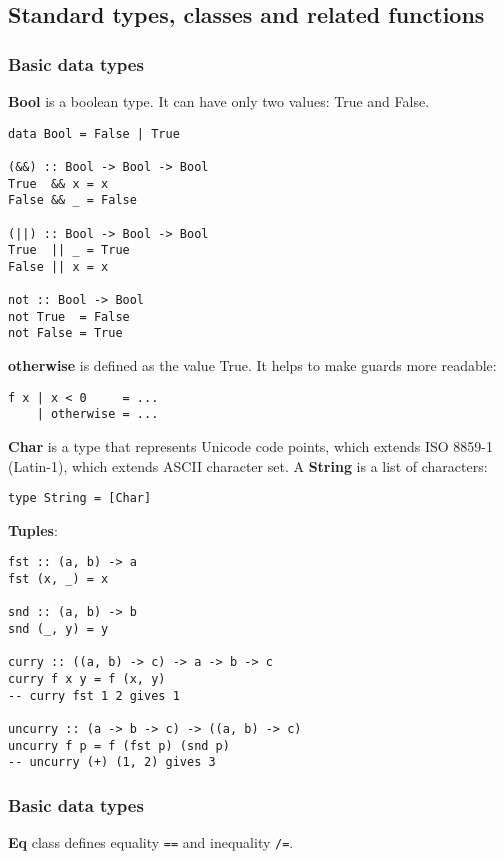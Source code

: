 %

\subsection{Standard types, classes and related functions}

\subsubsection{Basic data types}
\textbf{Bool} is a boolean type. It can have only two values: True and False.
\begin{verbatim}
data Bool = False | True

(&&) :: Bool -> Bool -> Bool
True  && x = x
False && _ = False

(||) :: Bool -> Bool -> Bool
True  || _ = True
False || x = x

not :: Bool -> Bool
not True  = False
not False = True
\end{verbatim}

\textbf{otherwise} is defined as the value True. It helps to make guards more readable:
\begin{verbatim}
f x | x < 0     = ...
    | otherwise = ...
\end{verbatim}




\textbf{Char} is a type that represents Unicode code points, which extends ISO 8859-1 (Latin-1), which extends ASCII character set.
A \textbf{String} is a list of characters:
\begin{verbatim}
type String = [Char]
\end{verbatim}

\textbf{Tuples}:
\begin{verbatim}
fst :: (a, b) -> a
fst (x, _) = x

snd :: (a, b) -> b
snd (_, y) = y

curry :: ((a, b) -> c) -> a -> b -> c
curry f x y = f (x, y)
-- curry fst 1 2 gives 1

uncurry :: (a -> b -> c) -> ((a, b) -> c)
uncurry f p = f (fst p) (snd p)
-- uncurry (+) (1, 2) gives 3
\end{verbatim}

\subsubsection{Basic data types}
\textbf{Eq} class defines equality \texttt{==} and inequality \texttt{/=}.

